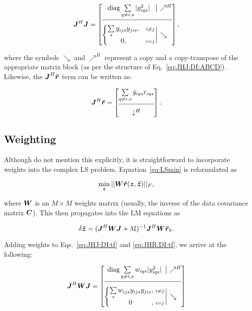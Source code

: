 \documentclass[useAMS,usenatbib]{mn2e}
\makeatletter
\newcommand{\II}{\mathbb{I}}
\newcommand{\mat}[1]{{\bmath{#1}}}
\newcommand{\JJ}{\mat{J}} %
\newcommand{\Matrix}[2]{\left [ \begin{array}{@{}#1@{}}#2\end{array} \right ]}
\newcommand{\Stack}[1]{\begin{array}{@{}c@{}}#1\end{array}}
\newcommand{\AUG}[1]{\bmath{\breve{#1}}}
\newcommand{\Zz}{\AUG{z}}
\newcommand{\Rr}{\AUG{r}}
\makeatother
\begin{document}
\begin{equation}
\label{eq:JHJ:DI:tf}
\JJ^H \JJ = 
\JHJblocks{
  \mathrm{diag} \sum\limits_{q\ne i,s} |y^2_{iqs}| 
}{
  \left \{ 
  \begin{array}{@{}cc@{}}
   \sum\limits_{s} y_{ijs}y_{jis},&{\scriptstyle i\ne j} \\
   0, &{\scriptstyle i=j}
  \end{array} \right . 
},
\end{equation}

where the symbols $\searrow$ and $\nearrow^H$ represent a copy and a copy-transpose of the appropriate matrix block (as per the structure of Eq.~\ref{eq:JHJ:DI:ABCD}). Likewise, the $\JJ^H\Rr$ term can be written as:

\begin{equation}
\label{eq:JHR:DI:tf}
\JJ^H\Rr 
= \Matrix{c}{
\sum\limits_{q\ne i,s} \bar{y}_{iqs} r_{iqs}   \\
 \hline \\[-8pt]
\downarrow^H
}.
\end{equation}

\subsection{Weighting}
\label{sec:DI:W}

Although \citet{ComplexOpt} do not mention this explicitly, it is straightforward to incorporate weights into the 
complex LS problem. Equation~\ref{eq:LSmin} is reformulated as

\begin{equation}
\label{eq:LSmin:w}
\min_{\bmath{z}} ||\mat{W} \Rr(\bmath{z},\bmath{\bar z})||_F,
\end{equation}

where $\mat{W}$ is an $M\times M$ weights matrix (usually, the inverse of the data covariance matrix $\mat{C}$). This then propagates into the LM equations as

\begin{equation}
\label{eq:LM:W}
\delta\Zz = (\JJ^H \mat{W} \JJ + \lambda\II)^{-1}\JJ^H \mat{W} \Rr_k.
\end{equation}

Adding weights to Eqs.~\ref{eq:JHJ:DI:tf} and \ref{eq:JHR:DI:tf}, we arrive at the following:


\begin{equation}
\label{eq:JHJ:DI:tfw}
\JJ^H\mat{W}\JJ = 
\JHJblocks{
  \mathrm{diag} \sum\limits_{q\ne i,s} w_{iqs} |y^2_{iqs}|
}{
  \left \{ 
  \begin{array}{@{}c@{,~}c@{}}
   \sum\limits_{s} w_{ijs} y_{ijs}y_{jis}&{\scriptstyle i\ne j} \\
   0 &{\scriptstyle i=j}
  \end{array} \right . 
}
\end{equation}
\end{document}
